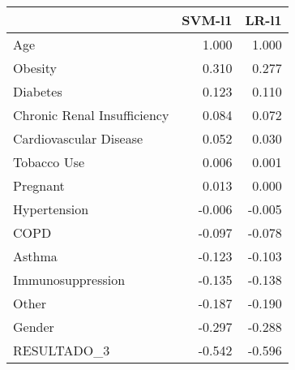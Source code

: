 \begin{tabular}{lrr}
\toprule
{} &  SVM-l1 &  LR-l1 \\
\midrule
Age                         &   1.000 &  1.000 \\
Obesity                     &   0.310 &  0.277 \\
Diabetes                    &   0.123 &  0.110 \\
Chronic Renal Insufficiency &   0.084 &  0.072 \\
Cardiovascular Disease      &   0.052 &  0.030 \\
Tobacco Use                 &   0.006 &  0.001 \\
Pregnant                    &   0.013 &  0.000 \\
Hypertension                &  -0.006 & -0.005 \\
COPD                        &  -0.097 & -0.078 \\
Asthma                      &  -0.123 & -0.103 \\
Immunosuppression           &  -0.135 & -0.138 \\
Other                       &  -0.187 & -0.190 \\
Gender                      &  -0.297 & -0.288 \\
RESULTADO\_3                 &  -0.542 & -0.596 \\
\bottomrule
\end{tabular}
